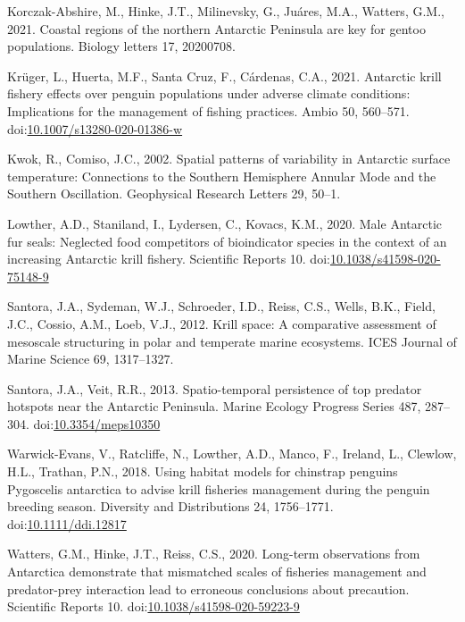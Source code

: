 \documentclass[]{elsarticle} %
\begin{document}
\leavevmode\hypertarget{ref-korczak-abshireCoastalRegionsNorthern2021}{}%
Korczak-Abshire, M., Hinke, J.T., Milinevsky, G., Juáres, M.A., Watters,
G.M., 2021. Coastal regions of the northern Antarctic Peninsula are key
for gentoo populations. Biology letters 17, 20200708.

\leavevmode\hypertarget{ref-Kruger2021}{}%
Krüger, L., Huerta, M.F., Santa Cruz, F., Cárdenas, C.A., 2021.
Antarctic krill fishery effects over penguin populations under adverse
climate conditions: Implications for the management of fishing
practices. Ambio 50, 560--571.
doi:\href{https://doi.org/10.1007/s13280-020-01386-w}{10.1007/s13280-020-01386-w}

\leavevmode\hypertarget{ref-kwokSpatialPatternsVariability2002}{}%
Kwok, R., Comiso, J.C., 2002. Spatial patterns of variability in
Antarctic surface temperature: Connections to the Southern Hemisphere
Annular Mode and the Southern Oscillation. Geophysical Research Letters
29, 50--1.

\leavevmode\hypertarget{ref-Lowther2020}{}%
Lowther, A.D., Staniland, I., Lydersen, C., Kovacs, K.M., 2020. Male
Antarctic fur seals: Neglected food competitors of bioindicator species
in the context of an increasing Antarctic krill fishery. Scientific
Reports 10.
doi:\href{https://doi.org/10.1038/s41598-020-75148-9}{10.1038/s41598-020-75148-9}

\leavevmode\hypertarget{ref-santoraKrillSpaceComparative2012}{}%
Santora, J.A., Sydeman, W.J., Schroeder, I.D., Reiss, C.S., Wells, B.K.,
Field, J.C., Cossio, A.M., Loeb, V.J., 2012. Krill space: A comparative
assessment of mesoscale structuring in polar and temperate marine
ecosystems. ICES Journal of Marine Science 69, 1317--1327.

\leavevmode\hypertarget{ref-Santora2013}{}%
Santora, J.A., Veit, R.R., 2013. Spatio-temporal persistence of top
predator hotspots near the Antarctic Peninsula. Marine Ecology Progress
Series 487, 287--304.
doi:\href{https://doi.org/10.3354/meps10350}{10.3354/meps10350}

\leavevmode\hypertarget{ref-Warwick-Evans2018}{}%
Warwick-Evans, V., Ratcliffe, N., Lowther, A.D., Manco, F., Ireland, L.,
Clewlow, H.L., Trathan, P.N., 2018. Using habitat models for chinstrap
penguins Pygoscelis antarctica to advise krill fisheries management
during the penguin breeding season. Diversity and Distributions 24,
1756--1771.
doi:\href{https://doi.org/10.1111/ddi.12817}{10.1111/ddi.12817}

\leavevmode\hypertarget{ref-Watters2020}{}%
Watters, G.M., Hinke, J.T., Reiss, C.S., 2020. Long-term observations
from Antarctica demonstrate that mismatched scales of fisheries
management and predator-prey interaction lead to erroneous conclusions
about precaution. Scientific Reports 10.
doi:\href{https://doi.org/10.1038/s41598-020-59223-9}{10.1038/s41598-020-59223-9}
\end{document}
